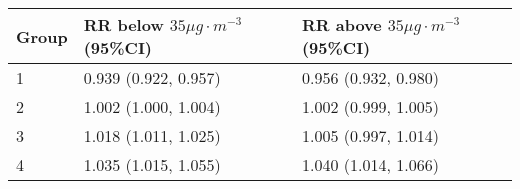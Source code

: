\begin{tabular}{lll}
  \hline
Group & RR below $35 \mu g \cdot m^{-3}$ (95\%CI) & RR above $35 \mu g \cdot m^{-3}$ (95\%CI) \\ 
  \hline
   1 & 0.939 (0.922, 0.957) & 0.956 (0.932, 0.980) \\ 
     2 & 1.002 (1.000, 1.004) & 1.002 (0.999, 1.005) \\ 
     3 & 1.018 (1.011, 1.025) & 1.005 (0.997, 1.014) \\ 
     4 & 1.035 (1.015, 1.055) & 1.040 (1.014, 1.066) \\ 
   \hline
\end{tabular}

